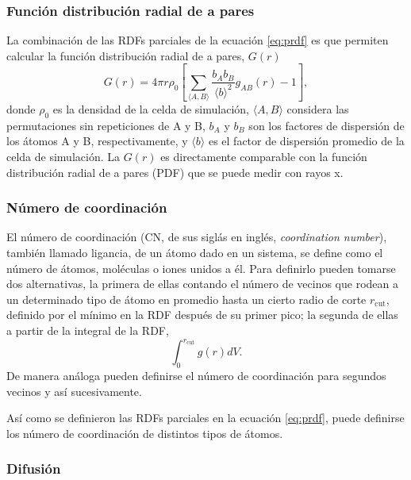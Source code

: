 \subsubsection{Función distribución radial de a pares}

La combinación de las RDFs parciales de la ecuación \ref{eq:prdf} es que permiten
calcular la función distribución radial de a pares, $G(r)$ \cite{billinge2019}
\begin{equation}
    G(r) = 4 \pi r \rho_0 \left[\sum_{\langle A,B \rangle} \frac{b_A b_B}{\langle b\rangle^2} g_{AB}(r) - 1\right], 
\end{equation}
donde $\rho_0$ es la densidad de la celda de simulación, $\langle A, B \rangle$
considera las permutaciones sin repeticiones de A y B, $b_A$ y $b_B$ son los 
factores de dispersión de los átomos A y B, respectivamente, y $\langle b \rangle$
es el factor de dispersión promedio de la celda de simulación. La $G(r)$ es 
directamente comparable con la función distribución radial de a pares (PDF) que 
se puede medir con rayos x.


\subsubsection{Número de coordinación}

El número de coordinación (CN, de sus siglás en inglés, \textit{coordination 
number}), también llamado ligancia, de un átomo dado en un sistema, se define 
como el número de átomos, moléculas o iones unidos a él. Para definirlo pueden 
tomarse dos alternativas, la primera de ellas contando el número de vecinos que 
rodean a un determinado tipo de átomo en promedio hasta un cierto radio de corte 
$r_{\text{cut}}$, definido por el mínimo en la RDF después de su primer pico; 
la segunda de ellas a partir de la integral de la RDF,
\begin{equation}
    \int_0^{r_{\text{cut}}} g(r) dV.
\end{equation}
De manera análoga pueden definirse el número de coordinación para segundos 
vecinos y así sucesivamente.

Así como se definieron las RDFs parciales en la ecuación \ref{eq:prdf}, puede 
definirse los número de coordinación de distintos tipos de átomos.


\subsubsection{Difusión}

